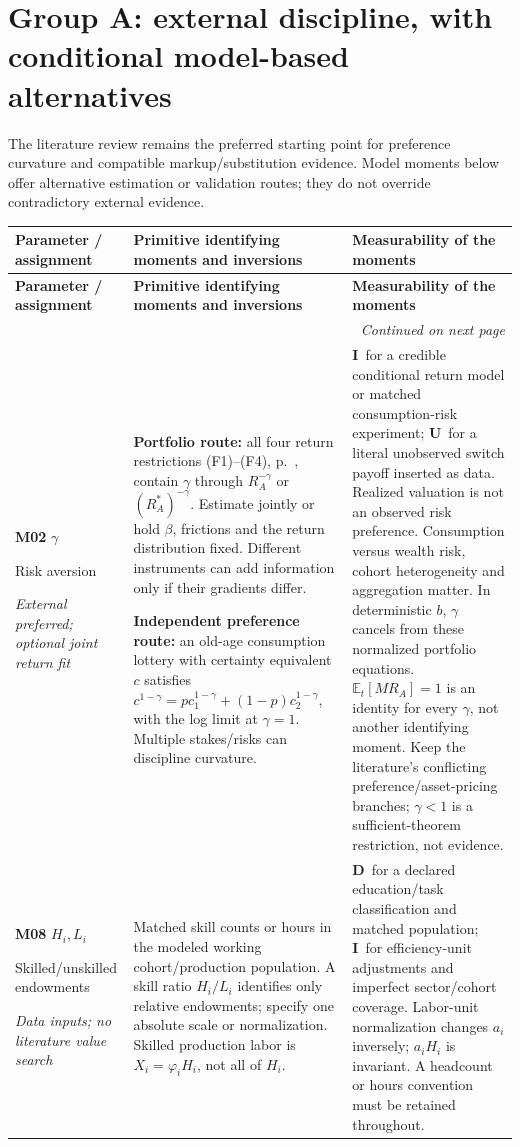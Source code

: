 \documentclass[10pt,a4paper,landscape]{article}
\makeatletter
\newcommand{\E}{\mathbb E_t}
\newcommand{\direct}{\textbf{D}}
\newcommand{\indirect}{\textbf{I}}
\newcommand{\unavail}{\textbf{U}}
\newcommand{\route}[1]{\par\textit{#1}}
\newenvironment{momenttable}{%
\fontsize{9.5}{11.2}\selectfont\setlength{\parskip}{3pt}
\begin{longtable}{@{}P{\dimexpr .16\textwidth-6.67pt\relax}P{\dimexpr .49\textwidth-6.67pt\relax}P{\dimexpr .35\textwidth-6.66pt\relax}@{}}
\toprule\rowcolor{tablehead}\textbf{Parameter / assignment} & \textbf{Primitive identifying moments and inversions} & \textbf{Measurability of the moments}\\\midrule
\endfirsthead
\toprule\rowcolor{tablehead}\textbf{Parameter / assignment} & \textbf{Primitive identifying moments and inversions} & \textbf{Measurability of the moments}\\\midrule
\endhead
\midrule\multicolumn{3}{r}{\footnotesize\itshape Continued on next page}\\\endfoot
\bottomrule\endlastfoot
}{\end{longtable}}
\makeatother
\begin{document}
\clearpage
\section{Group A: external discipline, with conditional model-based alternatives}
The literature review remains the preferred starting point for preference curvature and compatible markup/substitution evidence. Model moments below offer alternative estimation or validation routes; they do not override contradictory external evidence.
\begin{momenttable}
\textbf{M02} $\gamma$\par Risk aversion\route{External preferred; optional joint return fit}
& \textbf{Portfolio route:} all four return restrictions (F1)--(F4), p.~\pageref{sec:financial}, contain $\gamma$ through $R_A^{-\gamma}$ or $(R_A^*)^{-\gamma}$. Estimate jointly or hold $\beta$, frictions and the return distribution fixed. Different instruments can add information only if their gradients differ.\par
\textbf{Independent preference route:} an old-age consumption lottery with certainty equivalent $c$ satisfies
\(c^{1-\gamma}=p c_1^{1-\gamma}+(1-p)c_2^{1-\gamma}\), with the log limit at $\gamma=1$. Multiple stakes/risks can discipline curvature.
& \indirect\ for a credible conditional return model or matched consumption-risk experiment; \unavail\ for a literal unobserved switch payoff inserted as data. Realized valuation is not an observed risk preference. Consumption versus wealth risk, cohort heterogeneity and aggregation matter. In deterministic $b$, $\gamma$ cancels from these normalized portfolio equations. $\E[MR_A]=1$ is an identity for every $\gamma$, not another identifying moment. Keep the literature's conflicting preference/asset-pricing branches; $\gamma<1$ is a sufficient-theorem restriction, not evidence.\\[5pt]
\textbf{M08} $H_i,L_i$\par Skilled/unskilled endowments\route{Data inputs; no literature value search}
& Matched skill counts or hours in the modeled working cohort/production population. A skill ratio $H_i/L_i$ identifies only relative endowments; specify one absolute scale or normalization. Skilled production labor is $X_i=\varphi_iH_i$, not all of $H_i$.
& \direct\ for a declared education/task classification and matched population; \indirect\ for efficiency-unit adjustments and imperfect sector/cohort coverage. Labor-unit normalization changes $a_i$ inversely; $a_iH_i$ is invariant. A headcount or hours convention must be retained throughout.\\[5pt]

\end{momenttable}
\end{document}
